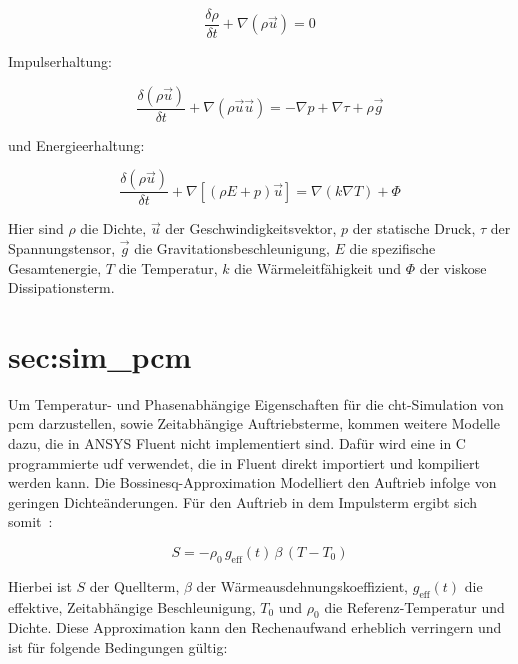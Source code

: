 \begin{equation}
  \label{eq:navier_massenerhaltung}
  \frac{\delta \rho}{\delta t} + \nabla \left( \rho \vec{u} \right) = 0
\end{equation}

Impulserhaltung:

\begin{equation}
  \label{eq:navier_impulserhaltung}
  \frac{\delta \left( \rho \vec{u} \right)}{\delta t} + \nabla \left( \rho \vec{u} \vec{u} \right) = -\nabla p + \nabla \tau + \rho \vec{g}
\end{equation}

und Energieerhaltung:

\begin{equation}
  \label{eq:navier_energieerhaltung}
  \frac{\delta \left(\rho \vec{u}\right)}{\delta t} + \nabla \left[\left(\rho E + p\right)\vec{u}\right] = \nabla \left(k \nabla T\right) + \Phi
\end{equation}

Hier sind $\rho$ die Dichte, $\vec{u}$ der Geschwindigkeitsvektor, $p$ der statische Druck, $\tau$ der Spannungstensor,
$\vec{g}$ die Gravitationsbeschleunigung, $E$ die spezifische Gesamtenergie, $T$ die Temperatur, $k$ die Wärmeleitfähigkeit
und $\Phi$ der viskose Dissipationsterm.

\section*{sec:sim_pcm}
Um Temperatur- und Phasenabhängige Eigenschaften für die \ac{cht}-Simulation von \ac{pcm} darzustellen, sowie Zeitabhängige Auftriebsterme, kommen weitere Modelle dazu,
die in ANSYS Fluent nicht implementiert sind. Dafür wird eine in C programmierte \ac{udf} verwendet, die in Fluent direkt importiert
und kompiliert werden kann.
Die Bossinesq-Approximation Modelliert den Auftrieb infolge von geringen Dichteänderungen. Für den Auftrieb
in dem Impulsterm ergibt sich somit~\cite{akamcae-udf}:

\begin{equation}
  \label{eq:udf_bouss}
  S = -\rho_0 \, g_\text{eff}(t)\,\beta\,(T-T_0)
\end{equation}

Hierbei ist $S$ der Quellterm, $\beta$ der Wärmeausdehnungskoeffizient, $g_\text{eff}(t)$ die effektive, Zeitabhängige Beschleunigung,
$T_0$ und $\rho_0$ die Referenz-Temperatur und Dichte. Diese Approximation kann den Rechenaufwand erheblich verringern und ist für folgende Bedingungen gültig:

